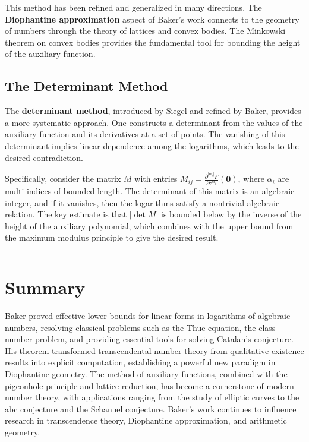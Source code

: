 This method has been refined and generalized in many directions. The \textbf{Diophantine approximation} aspect of Baker's work connects to the geometry of numbers through the theory of lattices and convex bodies. The Minkowski theorem on convex bodies provides the fundamental tool for bounding the height of the auxiliary function.

\subsection*{The Determinant Method}

The \textbf{determinant method}, introduced by Siegel and refined by Baker, provides a more systematic approach. One constructs a determinant from the values of the auxiliary function and its derivatives at a set of points. The vanishing of this determinant implies linear dependence among the logarithms, which leads to the desired contradiction.

Specifically, consider the matrix $M$ with entries $M_{ij} = \frac{\partial^{|\alpha_i|} F}{\partial z^{\alpha_i}}(\mathbf{0})$, where $\alpha_i$ are multi-indices of bounded length. The determinant of this matrix is an algebraic integer, and if it vanishes, then the logarithms satisfy a nontrivial algebraic relation. The key estimate is that $|\det M|$ is bounded below by the inverse of the height of the auxiliary polynomial, which combines with the upper bound from the maximum modulus principle to give the desired result.

\begin{center}\rule{0.5\linewidth}{0.5pt}\end{center}

\section*{Summary}

Baker proved effective lower bounds for linear forms in logarithms of algebraic numbers, resolving classical problems such as the Thue equation, the class number problem, and providing essential tools for solving Catalan's conjecture. His theorem transformed transcendental number theory from qualitative existence results into explicit computation, establishing a powerful new paradigm in Diophantine geometry. The method of auxiliary functions, combined with the pigeonhole principle and lattice reduction, has become a cornerstone of modern number theory, with applications ranging from the study of elliptic curves to the abc conjecture and the Schanuel conjecture. Baker's work continues to influence research in transcendence theory, Diophantine approximation, and arithmetic geometry.


